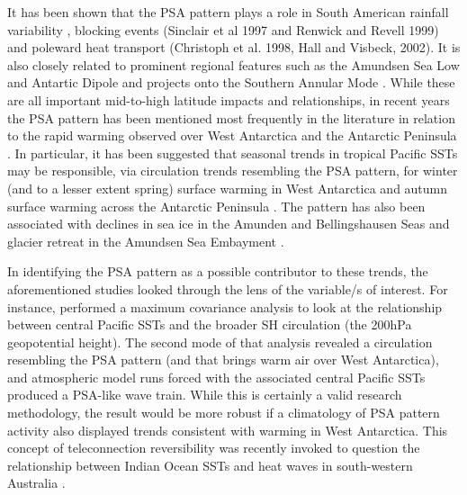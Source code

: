 It has been shown that the PSA pattern plays a role in South American rainfall variability \citep{Mo2001}, blocking events (Sinclair et al 1997 and Renwick and Revell 1999) and poleward heat transport (Christoph et al. 1998, Hall and Visbeck, 2002). It is also closely related to prominent regional features such as the Amundsen Sea Low \citep{Turner2013} and Antartic Dipole \citep{Yuan2001} and projects onto the Southern Annular Mode \citep{Ding2012}. While these are all important mid-to-high latitude impacts and relationships, in recent years the PSA pattern has been mentioned most frequently in the literature in relation to the rapid warming observed over West Antarctica and the Antarctic Peninsula \citep{Nicolas2014}. In particular, it has been suggested that seasonal trends in tropical Pacific SSTs may be responsible, via circulation trends resembling the PSA pattern, for winter (and to a lesser extent spring) surface warming in West Antarctica \citep{Ding2011} and autumn surface warming across the Antarctic Peninsula \citep{Ding2013}. The pattern has also been associated with declines in sea ice in the Amunden and Bellingshausen Seas \citep{Schneider2012} and glacier retreat in the Amundsen Sea Embayment \citep{Steig2012}.

In identifying the PSA pattern as a possible contributor to these trends, the aforementioned studies looked through the lens of the variable/s of interest. For instance, \citet{Ding2011} performed a maximum covariance analysis to look at the relationship between central Pacific SSTs and the broader SH circulation (the 200hPa geopotential height). The second mode of that analysis revealed a circulation resembling the PSA pattern (and that brings warm air over West Antarctica), and atmospheric model runs forced with the associated central Pacific SSTs produced a PSA-like wave train. While this is certainly a valid research methodology, the result would be more robust if a climatology of PSA pattern activity also displayed trends consistent with warming in West Antarctica. This concept of teleconnection reversibility was recently invoked to question the relationship between Indian Ocean SSTs and heat waves in south-western Australia \citep{Boschat2016}.  

